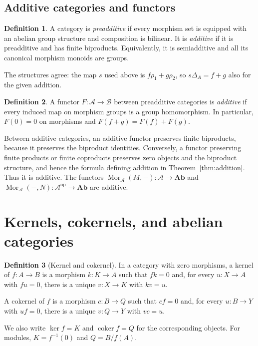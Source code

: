 \documentclass[11pt]{article}
\theoremstyle{definition}
\newtheorem{definition}{Definition}[section]
\theoremstyle{plain}
\newcommand{\A}{\mathcal A}
\newcommand{\B}{\mathcal B}
\newcommand{\Mor}{\operatorname{Mor}}
\newcommand{\coker}{\operatorname{coker}}
\newcommand{\Ab}{\mathbf{Ab}}
\begin{document}
\subsection*{Additive categories and functors}
\begin{definition}
A category is \emph{preadditive} if every morphism set is equipped with an abelian group structure and composition is bilinear. It is \emph{additive} if it is preadditive and has finite biproducts. Equivalently, it is semiadditive and all its canonical morphism monoids are groups.
\end{definition}
The structures agree: the map $s$ used above is $f\rho_1+g\rho_2$, so $s\Delta_A=f+g$ also for the given addition.

\begin{definition}
A functor $F\colon\A\to\B$ between preadditive categories is \emph{additive} if every induced map on morphism groups is a group homomorphism. In particular, $F(0)=0$ on morphisms and $F(f+g)=F(f)+F(g)$.
\end{definition}
Between additive categories, an additive functor preserves finite biproducts, because it preserves the biproduct identities. Conversely, a functor preserving finite products or finite coproducts preserves zero objects and the biproduct structure, and hence the formula defining addition in Theorem~\ref{thm:addition}. Thus it is additive. The functors $\Mor_{\A}(M,-)\colon\A\to\Ab$ and $\Mor_{\A}(-,N)\colon\A^{\mathrm{op}}\to\Ab$ are additive.

\section{Kernels, cokernels, and abelian categories}
\begin{definition}[Kernel and cokernel]
In a category with zero morphisms, a kernel of $f\colon A\to B$ is a morphism $k\colon K\to A$ such that $fk=0$ and, for every $u\colon X\to A$ with $fu=0$, there is a unique $v\colon X\to K$ with $kv=u$.

A cokernel of $f$ is a morphism $c\colon B\to Q$ such that $cf=0$ and, for every $u\colon B\to Y$ with $uf=0$, there is a unique $v\colon Q\to Y$ with $vc=u$.
\end{definition}
We also write $\ker f=K$ and $\coker f=Q$ for the corresponding objects. For modules, $K=f^{-1}(0)$ and $Q=B/f(A)$.
\end{document}
